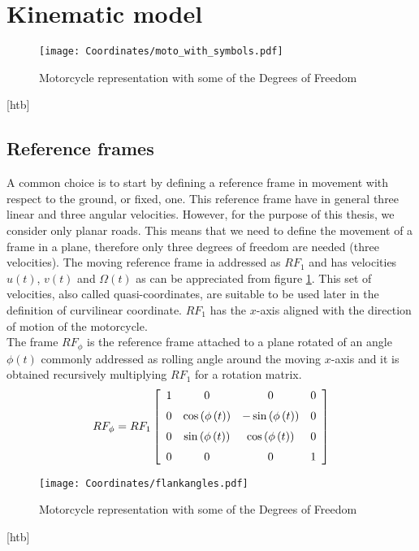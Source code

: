 \section{Kinematic model}
%
\begin{figure}[htb]
    \texttt{[image: Coordinates/moto\_with\_symbols.pdf]}
    \caption{Motorcycle representation with some of the Degrees of Freedom}
    \label{fig:MotoLean}
\end{figure}[htb]
%
\subsection{Reference frames}
%
A common choice is to start by defining a reference frame in movement with respect to the ground, or fixed, one. This reference frame have in general three linear and three angular velocities. However, for the purpose of this thesis, we consider only planar roads. This means that we need to define the movement of a frame in a plane, therefore only three degrees of freedom are needed (three velocities). The moving reference frame ia addressed as $RF_1$ and has velocities $u(t)$, $v(t)$ and $\Omega(t)$ as can be appreciated from figure \ref{fig:MotoLean}. This set of velocities, also called quasi-coordinates, are suitable to be used later in the definition of curvilinear coordinate. $RF_1$ has the $x$-axis aligned with the direction of motion of the motorcycle. \\
The frame $RF_\phi$ is the reference frame attached to a plane rotated of an angle $\phi(t)$ commonly addressed as rolling angle around the moving $x$-axis and it is obtained recursively multiplying $RF_1$ for a rotation matrix.
%
\begin{equation}
    RF_\phi = RF_1 
    \left[ \begin {array}{cccc} 1&0&0&0\\ \noalign{\medskip}0&\cos
    \left( \phi \left( t \right)  \right) &-\sin \left( \phi \left( t
    \right)  \right) &0\\ \noalign{\medskip}0&\sin \left( \phi \left( t
    \right)  \right) &\cos \left( \phi \left( t \right)  \right) &0
   \\ \noalign{\medskip}0&0&0&1\end {array} \right]   
\end{equation}
%
%
\begin{figure}[htb]
    \texttt{[image: Coordinates/flankangles.pdf]}
    \caption{Motorcycle representation with some of the Degrees of Freedom}
    \label{fig:MotoFlank}
\end{figure}[htb]
